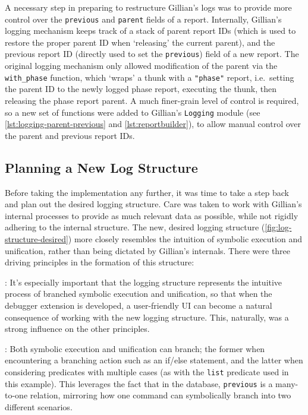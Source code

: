 A necessary step in preparing to restructure Gillian's logs was to provide more
control over the \texttt{previous} and \texttt{parent} fields of a report.
Internally, Gillian's logging mechanism keeps track of a stack of parent report
IDs (which is used to restore the proper parent ID when `releasing' the current
parent), and the previous report ID (directly used to set the \texttt{previous})
field of a new report. The original logging mechanism only allowed modification
of the parent via the \texttt{with\_phase} function, which `wraps' a thunk with
a \texttt{"phase"} report, i.e.\ setting the parent ID to the newly logged
phase report, executing the thunk, then releasing the phase report parent.
A much finer-grain level of control is required, so a new set of functions
were added to Gillian's \texttt{Logging} module (see
\autoref{lst:logging-parent-previous} and \autoref{lst:reportbuilder}), to allow
manual control over the parent and previous report IDs.


\subsection{Planning a New Log Structure}

Before taking the implementation any further, it was time to take a step back
and plan out the desired logging structure. Care was taken to work with
Gillian's internal processes to provide as much relevant data as possible,
while not rigidly adhering to the internal structure. The new, desired logging
structure (\autoref{fig:log-structure-desired}) more closely resembles the
intuition of symbolic execution and unification, rather than being dictated by
Gillian's internals. There were three driving principles in the formation of this
structure:

:
It's especially important that the logging structure represents the intuitive
process of branched symbolic execution and unification, so that when the
debugger extension is developed, a user-friendly UI can become a natural
consequence of working with the new logging structure. This, naturally, was a
strong influence on the other principles.

:
Both symbolic execution and unification can branch; the former when encountering
a branching action such as an if/else statement, and the latter when considering
predicates with multiple cases (as with the \texttt{list} predicate used in this
example). This leverages the fact that in the database, \texttt{previous} is a
many-to-one relation, mirroring how one command can symbolically branch into two
different scenarios.

